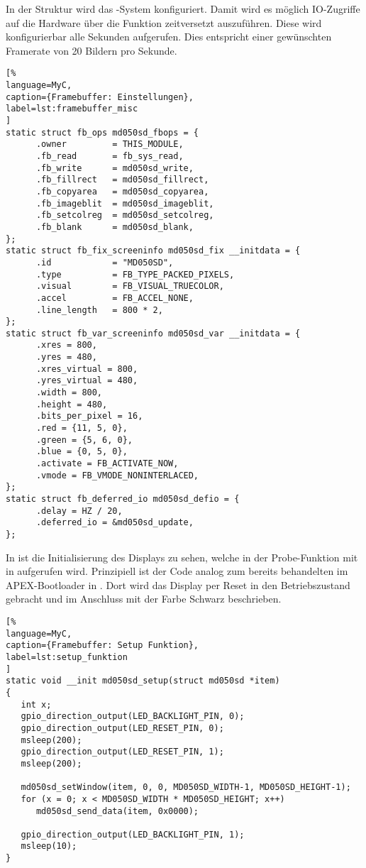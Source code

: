 In der Struktur  wird das -System konfiguriert. Damit wird es möglich IO-Zugriffe auf die Hardware über die Funktion  zeitversetzt auszuführen. Diese wird konfigurierbar alle  Sekunden aufgerufen. Dies entspricht einer gewünschten Framerate von 20 Bildern pro Sekunde. 
\begin{lstlisting}[%
language=MyC,
caption={Framebuffer: Einstellungen},
label=lst:framebuffer_misc
]
static struct fb_ops md050sd_fbops = {
      .owner         = THIS_MODULE,
      .fb_read       = fb_sys_read,
      .fb_write      = md050sd_write,
      .fb_fillrect   = md050sd_fillrect,
      .fb_copyarea   = md050sd_copyarea,
      .fb_imageblit  = md050sd_imageblit,
      .fb_setcolreg  = md050sd_setcolreg,
      .fb_blank      = md050sd_blank,
};
static struct fb_fix_screeninfo md050sd_fix __initdata = {
      .id            = "MD050SD",
      .type          = FB_TYPE_PACKED_PIXELS,
      .visual        = FB_VISUAL_TRUECOLOR,
      .accel         = FB_ACCEL_NONE,
      .line_length   = 800 * 2,
};
static struct fb_var_screeninfo md050sd_var __initdata = {
      .xres = 800,
      .yres = 480,
      .xres_virtual = 800,
      .yres_virtual = 480,
      .width = 800,
      .height = 480,
      .bits_per_pixel = 16,
      .red = {11, 5, 0},
      .green = {5, 6, 0},
      .blue = {0, 5, 0},
      .activate = FB_ACTIVATE_NOW,
      .vmode = FB_VMODE_NONINTERLACED,
};
static struct fb_deferred_io md050sd_defio = {
      .delay = HZ / 20,
      .deferred_io = &md050sd_update,
};
\end{lstlisting}

In  ist die Initialisierung des Displays zu sehen, welche in der Probe-Funktion mit  in  aufgerufen wird. Prinzipiell ist der Code analog zum bereits behandelten im APEX-Bootloader in . Dort wird das Display per Reset in den Betriebszustand gebracht und im Anschluss mit der Farbe Schwarz beschrieben.

\begin{lstlisting}[%
language=MyC,
caption={Framebuffer: Setup Funktion},
label=lst:setup_funktion
]
static void __init md050sd_setup(struct md050sd *item)
{
   int x;
   gpio_direction_output(LED_BACKLIGHT_PIN, 0);
   gpio_direction_output(LED_RESET_PIN, 0);
   msleep(200);
   gpio_direction_output(LED_RESET_PIN, 1);
   msleep(200);

   md050sd_setWindow(item, 0, 0, MD050SD_WIDTH-1, MD050SD_HEIGHT-1);
   for (x = 0; x < MD050SD_WIDTH * MD050SD_HEIGHT; x++)
      md050sd_send_data(item, 0x0000);

   gpio_direction_output(LED_BACKLIGHT_PIN, 1);
   msleep(10);
}
\end{lstlisting}

